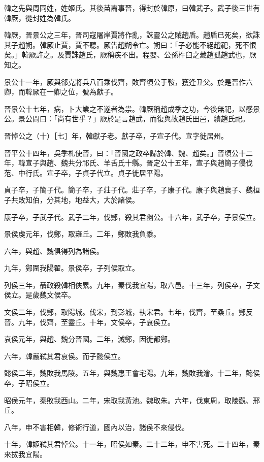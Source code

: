 
\begin{pinyinscope}
韓之先與周同姓，姓姬氏。其後苗裔事晉，得封於韓原，曰韓武子。武子後三世有韓厥，從封姓為韓氏。

韓厥，晉景公之三年，晉司寇屠岸賈將作亂，誅靈公之賊趙盾。趙盾已死矣，欲誅其子趙朔。韓厥止賈，賈不聽。厥告趙朔令亡。朔曰：「子必能不絕趙祀，死不恨矣。」韓厥許之。及賈誅趙氏，厥稱疾不出。程嬰、公孫杵臼之藏趙孤趙武也，厥知之。

景公十一年，厥與郤克將兵八百乘伐齊，敗齊頃公于鞍，獲逢丑父。於是晉作六卿，而韓厥在一卿之位，號為獻子。

晉景公十七年，病，卜大業之不遂者為祟。韓厥稱趙成季之功，今後無祀，以感景公。景公問曰：「尚有世乎？」厥於是言趙武，而復與故趙氏田邑，續趙氏祀。

晉悼公之（十）［七］年，韓獻子老。獻子卒，子宣子代。宣字徙居州。

晉平公十四年，吳季札使晉，曰：「晉國之政卒歸於韓、魏、趙矣。」晉頃公十二年，韓宣子與趙、魏共分祁氏、羊舌氏十縣。晉定公十五年，宣子與趙簡子侵伐范、中行氏。宣子卒，子貞子代立。貞子徙居平陽。

貞子卒，子簡子代。簡子卒，子莊子代。莊子卒，子康子代。康子與趙襄子、魏桓子共敗知伯，分其地，地益大，大於諸侯。

康子卒，子武子代。武子二年，伐鄭，殺其君幽公。十六年，武子卒，子景侯立。

景侯虔元年，伐鄭，取雍丘。二年，鄭敗我負黍。

六年，與趙、魏俱得列為諸侯。

九年，鄭圍我陽翟。景侯卒，子列侯取立。

列侯三年，聶政殺韓相俠累。九年，秦伐我宜陽，取六邑。十三年，列侯卒，子文侯立。是歲魏文侯卒。

文侯二年，伐鄭，取陽城。伐宋，到彭城，執宋君。七年，伐齊，至桑丘。鄭反晉。九年，伐齊，至靈丘。十年，文侯卒，子哀侯立。

哀侯元年，與趙、魏分晉國。二年，滅鄭，因徙都鄭。

六年，韓嚴弒其君哀侯。而子懿侯立。

懿侯二年，魏敗我馬陵。五年，與魏惠王會宅陽。九年，魏敗我澮。十二年，懿侯卒，子昭侯立。

昭侯元年，秦敗我西山。二年，宋取我黃池。魏取朱。六年，伐東周，取陵觀、邢丘。

八年，申不害相韓，修術行道，國內以治，諸侯不來侵伐。

十年，韓姬弒其君悼公。十一年，昭侯如秦。二十二年，申不害死。二十四年，秦來拔我宜陽。


\end{pinyinscope}
